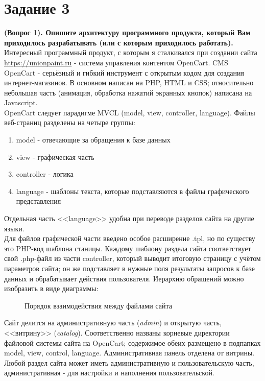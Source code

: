 \documentclass[a4paper,12pt]{article} %
\begin{document}
\section{Задание 3}
\textbf{(Вопрос 1). Опишите архитектуру программного продукта, который Вам приходилось разрабатывать (или с которым приходилось работать).}
Интересный программный продукт, с которым я сталкивался при создании сайта \url{https://unionpaint.ru} - система управления контентом OpenCart. CMS OpenCart - серьёзный и гибкий инструмент с открытым кодом для создания интернет-магазинов. В основном написан на PHP, HTML и CSS; относительно небольшая часть (анимация, обработка нажатий экранных кнопок) написана на Javascript.\\
OpenCart следует парадигме MVCL (model, view, controller, language). Файлы веб-страниц разделены на четыре группы:
\begin{enumerate}
	\item model - отвечающие за обращения к базе данных 
	\item view - графическая часть
	\item controller - логика
	\item language - шаблоны текста, которые подставляются в файлы графического представления
\end{enumerate}
Отдельная часть <<language>> удобна при переводе разделов сайта на другие языки.\\
Для файлов графической части введено особое расширение .tpl, но по существу это PHP-код шаблона станицы. Каждому шаблону раздела сайта соответствует свой .php-файл из части controller, который выводит итоговую страницу с учётом параметров сайта; он же подставляет в нужные поля результаты запросов к базе данных и обрабатывает действия пользователя. Иерархию обращений можно изобразить в виде диаграммы:\\
\begin{figure}[H]
	\caption{Порядок взаимодействия между файлами сайта}
	\label{hierarchy}
\end{figure}
Сайт делится на административную часть (\textit{admin}) и открытую часть, <<витрину>> (\textit{catalog}). Соответственно названы корневые директории файловой системы сайта на OpenCart; содержимое обеих размещено в подпапках model, view, control, language. Административная панель отделена от витрины. Любой раздел сайта может иметь административную и пользовательскую часть, административная - для настройки и наполнения пользовательской.\\
\end{document}
